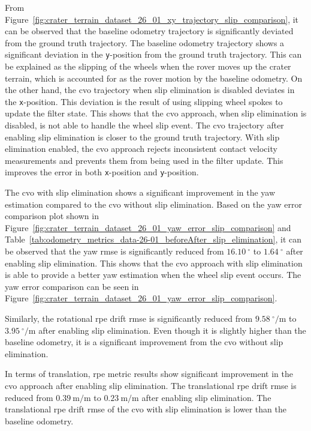 \documentclass[report.tex]{subfiles}
\begin{document}
    
    From Figure~\ref{fig:crater_terrain_dataset_26_01_xy_trajectory_slip_comparison}, it can be observed that the baseline odometry trajectory is significantly deviated from the ground truth trajectory. The baseline odometry trajectory shows a significant deviation in the \texttt{y}-position from the ground truth trajectory. This can be explained as the slipping of the wheels when the rover moves up the crater terrain, which is accounted for as the rover motion by the baseline odometry. On the other hand, the \gls{cvo} trajectory when slip elimination is disabled deviates in the \texttt{x}-position. This deviation is the result of using slipping wheel spokes to update the filter state. This shows that the \gls{cvo} approach, when slip elimination is disabled, is not able to handle the wheel slip event. The \gls{cvo} trajectory after enabling slip elimination is closer to the ground truth trajectory. With slip elimination enabled, the \gls{cvo} approach rejects inconsistent contact velocity measurements and prevents them from being used in the filter update. This improves the error in both \texttt{x}-position and \texttt{y}-position. 
        
    The \gls{cvo} with slip elimination shows a significant improvement in the yaw estimation compared to the \gls{cvo} without slip elimination. Based on the yaw error comparison plot shown in Figure~\ref{fig:crater_terrain_dataset_26_01_yaw_error_slip_comparison} and Table~\ref{tab:odometry_metrics_data-26-01_beforeAfter_slip_elimination}, it can be observed that the yaw \gls{rmse} is significantly reduced from $16.10~^\circ$ to $1.64~^\circ$ after enabling slip elimination. This shows that the \gls{cvo} approach with slip elimination is able to provide a better yaw estimation when the wheel slip event occurs. The yaw error comparison can be seen in Figure~\ref{fig:crater_terrain_dataset_26_01_yaw_error_slip_comparison}. 
    
    Similarly, the rotational \gls{rpe} drift \gls{rmse} is significantly reduced from $9.58~^\circ/\mathrm{m}$ to $3.95~^\circ/\mathrm{m}$ after enabling slip elimination. Even though it is slightly higher than the baseline odometry, it is a significant improvement from the \gls{cvo} without slip elimination.
    
    In terms of translation, \gls{rpe} metric results show significant improvement in the \gls{cvo} approach after enabling slip elimination. The translational \gls{rpe} drift \gls{rmse} is reduced from $0.39~\mathrm{m/m}$ to $0.23~\mathrm{m/m}$ after enabling slip elimination. The translational \gls{rpe} drift \gls{rmse} of the \gls{cvo} with slip elimination is lower than the baseline odometry. 
    
\end{document}
